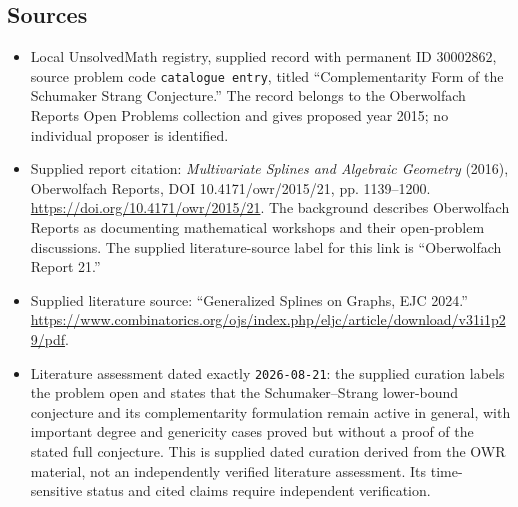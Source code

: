 \documentclass[11pt]{article}
\begin{document}
\subsection{Sources}
\begin{itemize}
\item Local UnsolvedMath registry, supplied record with permanent ID \(30002862\), source problem code \texttt{catalogue entry}, titled ``Complementarity Form of the Schumaker Strang Conjecture.'' The record belongs to the Oberwolfach Reports Open Problems collection and gives proposed year 2015; no individual proposer is identified.
\item Supplied report citation: \emph{Multivariate Splines and Algebraic Geometry} (2016), Oberwolfach Reports, DOI 10.4171/owr/2015/21, pp. 1139--1200. \url{https://doi.org/10.4171/owr/2015/21}. The background describes Oberwolfach Reports as documenting mathematical workshops and their open-problem discussions. The supplied literature-source label for this link is ``Oberwolfach Report 21.''
\item Supplied literature source: ``Generalized Splines on Graphs, EJC 2024.'' \url{https://www.combinatorics.org/ojs/index.php/eljc/article/download/v31i1p29/pdf}.
\item Literature assessment dated exactly \texttt{2026-08-21}: the supplied curation labels the problem open and states that the Schumaker--Strang lower-bound conjecture and its complementarity formulation remain active in general, with important degree and genericity cases proved but without a proof of the stated full conjecture. This is supplied dated curation derived from the OWR material, not an independently verified literature assessment. Its time-sensitive status and cited claims require independent verification.
\end{itemize}
\end{document}
